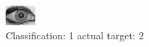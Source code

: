 \begin{figure}[h!]
\begin{center}
\includegraphics[width=0.60\columnwidth]{figures/ID1994_class_1_target_2.png}
\end{center}
\caption{ Classification: 1 actual target: 2}
\label{fig:ID1994_class_1_target_2}
\end{figure}
